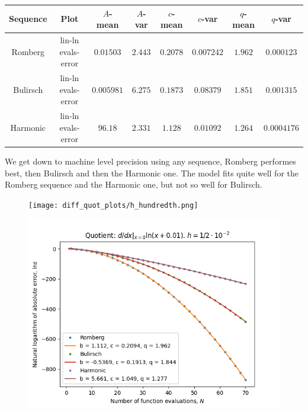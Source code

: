 \begin{table}[H]
    \centering
    \small
    \begin{tabular}{c|c||c|c|c|c|c|c}
Sequence & Plot & \(A\)-mean & \(A\)-var & \(c\)-mean & \(c\)-var & \(q\)-mean & \(q\)-var\\\hline
Romberg & lin-ln evals-error & \(0.01503\) & \(2.443\) & \(0.2078\) & \(0.007242\) & \(1.962\) & \(0.000123\) \\
Bulirsch & lin-ln evals-error & \(0.005981\) & \(6.275\) & \(0.1873\) & \(0.08379\) & \(1.851\) & \(0.001315\) \\
Harmonic & lin-ln evals-error & \(96.18\) & \(2.331\) & \(1.128\) & \(0.01092\) & \(1.264\) & \(0.0004176\) \\
    \end{tabular}
    \label{tab:my_label}
\end{table}

We get down to machine level precision using any sequence, Romberg performes best, then Bulirsch and then the Harmonic one. The model fits quite well for the Romberg sequence and the Harmonic one, but not so well for Bulirsch.

\begin{figure}[H]
\centering
\begin{minipage}{0.45\textwidth}
\centering
\texttt{[image: diff\_quot\_plots/h\_hundredth.png]}
\end{minipage}
\begin{minipage}{0.45\textwidth}
\centering
\includegraphics[scale=0.45]{diff_quot_plots/h_hundredth_hp_trend.png}
\end{minipage}
\end{figure}

